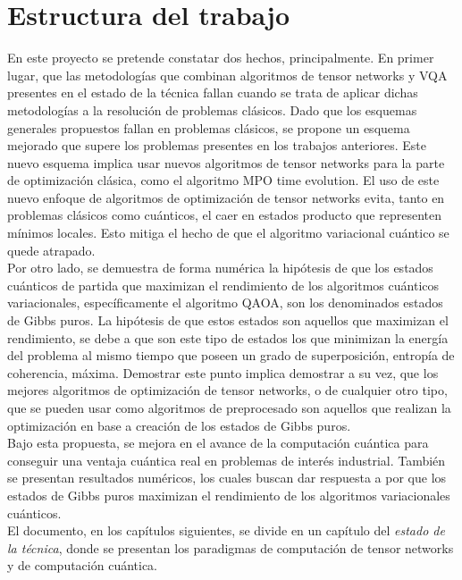 \newpage

\section{Estructura del trabajo}

En este proyecto se pretende constatar dos hechos, principalmente. En primer lugar, que las metodologías que combinan algoritmos de tensor networks y VQA presentes en el estado de la técnica fallan cuando se trata de aplicar dichas metodologías a la resolución de problemas clásicos. Dado que los esquemas generales propuestos fallan en problemas clásicos, se propone un esquema mejorado que supere los problemas presentes en los trabajos anteriores. Este nuevo esquema implica usar nuevos algoritmos de tensor networks para la parte de optimización clásica, como el algoritmo MPO time evolution. El uso de este nuevo enfoque de algoritmos de optimización de tensor networks evita, tanto en problemas clásicos como cuánticos, el caer en estados producto que representen mínimos locales. Esto mitiga el hecho de que el algoritmo variacional cuántico se quede atrapado. \\

Por otro lado, se demuestra de forma numérica la hipótesis de que los estados cuánticos de partida que maximizan el rendimiento de los algoritmos cuánticos variacionales, específicamente el algoritmo QAOA, son los denominados estados de Gibbs puros. La hipótesis de que estos estados son aquellos que maximizan el rendimiento, se debe a que son este tipo de estados los que minimizan la energía del problema al mismo tiempo que poseen un grado de superposición, entropía de coherencia, máxima. Demostrar este punto implica demostrar a su vez, que los mejores algoritmos de optimización de tensor networks, o de cualquier otro tipo, que se pueden usar como algoritmos de preprocesado son aquellos que realizan la optimización en base a creación de los estados de Gibbs puros. \\

Bajo esta propuesta, se mejora en el avance de la computación cuántica para conseguir una ventaja cuántica real en problemas de interés industrial. También se presentan resultados numéricos, los cuales buscan dar respuesta a por que los estados de Gibbs puros maximizan el rendimiento de los algoritmos variacionales cuánticos. \\

El documento, en los capítulos siguientes, se divide en un capítulo del \textit{estado de la técnica}, donde se presentan los paradigmas de computación de tensor networks y de computación cuántica. 

